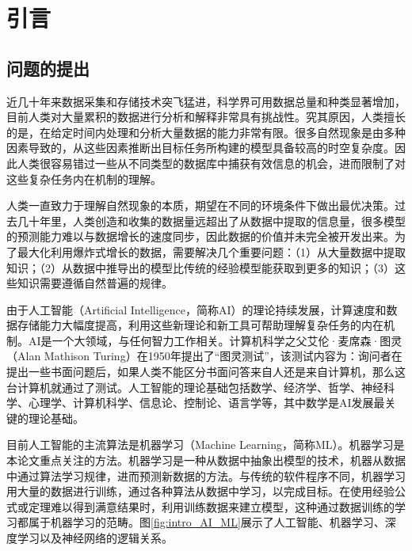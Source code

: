 \chapter{引言}\label{chap:introduction}

\section{问题的提出}\label{sec:intro_question}

近几十年来数据采集和存储技术突飞猛进，科学界可用数据总量和种类显著增加，目前人类对大量累积的数据进行分析和解释非常具有挑战性\citep{bougher2016machine}。究其原因，人类擅长的是，在给定时间内处理和分析大量数据的能力非常有限\citep{bougher2016machine}。很多自然现象是由多种因素导致的，从这些因素推断出目标任务所构建的模型具备较高的时空复杂度\citep{reitsma2010geoscience}。因此人类很容易错过一些从不同类型的数据库中捕获有效信息的机会，进而限制了对这些复杂任务内在机制的理解\citep{feyyad1996data}。

人类一直致力于理解自然现象的本质，期望在不同的环境条件下做出最优决策。过去几十年里，人类创造和收集的数据量远超出了从数据中提取的信息量，很多模型的预测能力难以与数据增长的速度同步，因此数据的价值并未完全被开发出来。为了最大化利用爆炸式增长的数据，需要解决几个重要问题：（1）从大量数据中提取知识；（2）从数据中推导出的模型比传统的经验模型能获取到更多的知识；（3）这些知识需要遵循自然普遍的规律。

由于人工智能（Artificial Intelligence，简称AI）的理论持续发展，计算速度和数据存储能力大幅度提高，利用这些新理论和新工具可帮助理解复杂任务的内在机制。AI是一个大领域，与任何智力工作相关。计算机科学之父艾伦·麦席森·图灵（Alan Mathison Turing）在1950年提出了“图灵测试”，该测试内容为：询问者在提出一些书面问题后，如果人类不能区分书面问答来自人还是来自计算机，那么这台计算机就通过了测试\citep{turing2009computing}。人工智能的理论基础包括数学、经济学、哲学、神经科学、心理学、计算机科学、信息论、控制论、语言学等，其中数学是AI发展最关键的理论基础。

目前人工智能的主流算法是机器学习（Machine Learning，简称ML）。机器学习是本论文重点关注的方法。机器学习是一种从数据中抽象出模型的技术，机器从数据中通过算法学习规律，进而预测新数据的方法。与传统的软件程序不同，机器学习用大量的数据进行训练，通过各种算法从数据中学习，以完成目标。在使用经验公式或定理难以得到满意结果时，利用训练数据来建立模型，这种通过数据训练的学习都属于机器学习的范畴。图\ref{fig:intro_AI_ML}展示了人工智能、机器学习、深度学习以及神经网络的逻辑关系。

